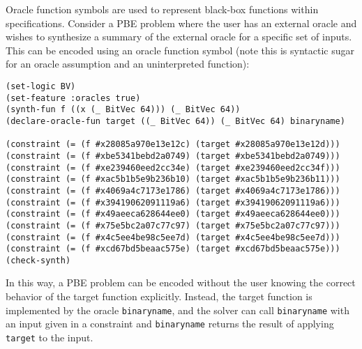 \documentclass[english,a4paper,10pt]{article}
\begin{document}
\begin{example}
Oracle function symbols are used to represent black-box functions within specifications. Consider a PBE problem where the user has an external oracle and wishes to synthesize a summary of the external oracle for a specific set of inputs. This can be encoded
using an oracle function symbol (note this is syntactic sugar for an oracle assumption and an uninterpreted function):
\begin{lstlisting}[language=SyGuS]
(set-logic BV)
(set-feature :oracles true) 
(synth-fun f ((x (_ BitVec 64))) (_ BitVec 64))
(declare-oracle-fun target ((_ BitVec 64)) (_ BitVec 64) binaryname)

(constraint (= (f #x28085a970e13e12c) (target #x28085a970e13e12d)))
(constraint (= (f #xbe5341bebd2a0749) (target #xbe5341bebd2a0749)))
(constraint (= (f #xe239460eed2cc34e) (target #xe239460eed2cc34f)))
(constraint (= (f #xac5b1b5e9b236b10) (target #xac5b1b5e9b236b11)))
(constraint (= (f #x4069a4c7173e1786) (target #x4069a4c7173e1786)))
(constraint (= (f #x39419062091119a6) (target #x39419062091119a6)))
(constraint (= (f #x49aeeca628644ee0) (target #x49aeeca628644ee0)))
(constraint (= (f #x75e5bc2a07c77c97) (target #x75e5bc2a07c77c97)))
(constraint (= (f #x4c5ee4be98c5ee7d) (target #x4c5ee4be98c5ee7d)))
(constraint (= (f #xcd67bd5beaac575e) (target #xcd67bd5beaac575e)))
(check-synth)
\end{lstlisting}
In this way, a PBE problem can be encoded without the user knowing the correct behavior of the target function explicitly. 
Instead, the target function is implemented by the oracle \lstinline{binaryname}, 
and the solver can call \lstinline{binaryname} with an input given in a constraint 
and \lstinline{binaryname} returns the result of applying \lstinline{target} to the input.
\end{example}
\end{document}
